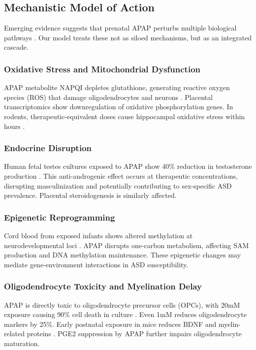 \documentclass[12pt]{article}
\begin{document}
\subsection{Mechanistic Model of Action}
Emerging evidence suggests that prenatal APAP perturbs multiple biological pathways \citep{baker2020,kristensen2016,zhu2021}. Our model treats these not as siloed mechanisms, but as an integrated cascade.

\subsubsection{Oxidative Stress and Mitochondrial Dysfunction}
APAP metabolite NAPQI depletes glutathione, generating reactive oxygen species (ROS) that damage oligodendrocytes and neurons \citep{parker2020,posadas2019}. Placental transcriptomics show downregulation of oxidative phosphorylation genes. In rodents, therapeutic-equivalent doses cause hippocampal oxidative stress within hours \citep{philippot2022,riffel2020}.

\subsubsection{Endocrine Disruption}
Human fetal testes cultures exposed to APAP show 40\% reduction in testosterone production \citep{kristensen2016,vanmaldergem2018}. This anti-androgenic effect occurs at therapeutic concentrations, disrupting masculinization and potentially contributing to sex-specific ASD prevalence. Placental steroidogenesis is similarly affected.

\subsubsection{Epigenetic Reprogramming}
Cord blood from exposed infants shows altered methylation at neurodevelopmental loci \citep{ji2020}. APAP disrupts one-carbon metabolism, affecting SAM production and DNA methylation maintenance. These epigenetic changes may mediate gene-environment interactions in ASD susceptibility.

\subsubsection{Oligodendrocyte Toxicity and Myelination Delay}
APAP is directly toxic to oligodendrocyte precursor cells (OPCs), with 20mM exposure causing 90\% cell death in culture \citep{perez2012}. Even 1mM reduces oligodendrocyte markers by 25\%. Early postnatal exposure in mice reduces BDNF and myelin-related proteins \citep{blecharz2018}. PGE2 suppression by APAP further impairs oligodendrocyte maturation.
\end{document}
